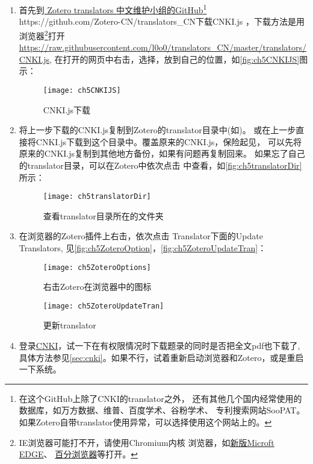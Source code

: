 \documentclass[cn,11pt,chinese]{elegantbook}
\begin{document}
			\begin{enumerate}
				\item\label{it:cnkijs}
					首先到\href{https://github.com/Zotero-CN/translators_CN}{ Zotero translators 
					中文维护小组的GitHub\footnote{在这个GitHub上除了CNKI的translator之外，
					还有其他几个国内经常使用的数据库，如万方数据、维普、百度学术、谷粉学术、
					专利搜索网站SooPAT。如果Zotero自带translator使用异常，可以选择使用这个网站上的。} 
					\url{ https://github.com/Zotero-CN/translators_CN}}下载CNKI.js
					，下载方法是用浏览器\footnote{IE浏览器可能打不开，请使用Chromium内核
					浏览器，如\href{https://www.microsoft.com/zh-cn/edge}{新版Microft EDGE}、
					\href{http://www.centbrowser.cn/history.html}{百分浏览器}等打开。}打开
					\url{https://raw.githubusercontent.com/l0o0/translators_CN/master/translators/CNKI.js},
					在打开的网页中右击，选择，放到自己的位置，如\autoref{fig:ch5CNKIJS}图示：
					\begin{figure}[htbp]
						\centering
						\texttt{[image: ch5CNKIJS]}
						\caption{CNKI.js下载}
						\label{fig:ch5CNKIJS}
					\end{figure}
				\item
				  将上一步下载的CNKI.js复制到Zotero的translator目录中(如)。
				  或在上一步直接将CNKI.js下载到这个目录中。覆盖原来的CNKI.js，保险起见，
				  可以先将原来的CNKI.js复制到其他地方备份，如果有问题再复制回来。
				  如果忘了自己的translator目录，可以在Zotero中依次点击
				  中查看，如\autoref{fig:ch5translatorDir}所示：
					  \begin{figure}[htbp]
					  	\centering
					  	\texttt{[image: ch5translatorDir]}
					  	\caption{查看translator目录所在的文件夹}
					  	\label{fig:ch5translatorDir}
					  \end{figure}
				  \item
				  在浏览器的Zotero插件上右击，依次点击 Translator下面的Update Translators,
				  见\autoref{fig:ch5ZoteroOption}，\autoref{fig:ch5ZoteroUpdateTran}：
				  \begin{figure}[htbp]
				  	\centering
				  	\texttt{[image: ch5ZoteroOptions]}
				  	\caption{右击Zotero在浏览器中的图标}
				  	\label{fig:ch5ZoteroOption}
				  \end{figure}
			     \begin{figure}[htbp]
			  	  \centering
			  	  \texttt{[image: ch5ZoteroUpdateTran]}
			  	  \caption{更新translator}
			  	  \label{fig:ch5ZoteroUpdateTran}
			     \end{figure}
				\item
				登录\href{http://www.cnki.net}{CNKI}，试一下在有权限情况时下载题录的同时是否把全文pdf也下载了,
				具体方法参见\cref{sec:cnki}。如果不行，试着重新启动浏览器和Zotero，或是重启一下系统。
				\end{enumerate}
			
\end{document}
